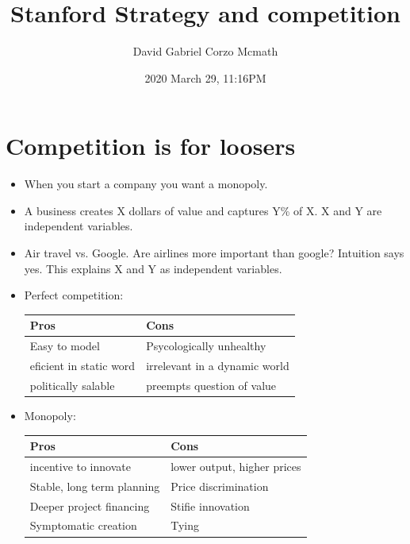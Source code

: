 \documentclass{article}
\title{Stanford Strategy and competition}
\date{2020 March 29, 11:16PM}
\author{David Gabriel Corzo Mcmath}
\begin{document}
\maketitle


\section{Competition is for loosers}
\begin{itemize}
    \item When you start a company you want a monopoly.
    \item A business creates X dollars of value and captures Y\% of X. X and Y are independent variables.
    \item Air travel vs. Google. Are airlines more important than google? Intuition says yes. This explains X and Y as independent variables.
    \item Perfect competition:
        \begin{center}
            \begin{tabular}{ |l|l| }
                \hline
                    Pros & Cons \\
                \hline
                    Easy to model & Psycologically unhealthy \\ 
                    eficient in static word & irrelevant in a dynamic world \\ 
                    politically salable & preempts question of value \\ 
                \hline
            \end{tabular}
        \end{center}
    
    \item Monopoly: 
        \begin{center}
            \begin{tabular}{ |l|l| }
                \hline
                    Pros & Cons \\ 
                \hline
                    incentive to innovate & lower output, higher prices \\ 
                    Stable, long term planning & Price discrimination \\ 
                    Deeper project financing & Stifie innovation \\ 
                    Symptomatic creation & Tying \\
                \hline
            \end{tabular}
        \end{center}
    

\end{itemize}
\end{document}
